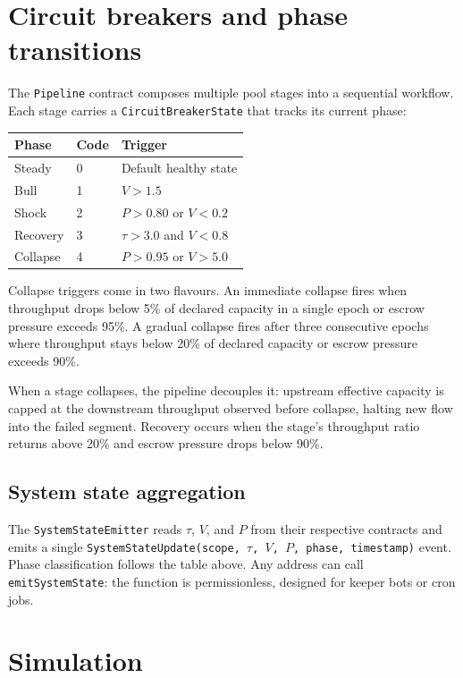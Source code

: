 \documentclass[11pt]{article}
\theoremstyle{definition}
\theoremstyle{remark}
\begin{document}
\section{Circuit breakers and phase transitions}
\label{sec:circuit}

The \texttt{Pipeline} contract composes multiple pool stages into a
sequential workflow. Each stage carries a \texttt{CircuitBreakerState}
that tracks its current phase:

\begin{center}
\begin{tabular}{lll}
\toprule
Phase & Code & Trigger \\
\midrule
Steady     & 0 & Default healthy state \\
Bull       & 1 & $V > 1.5$ \\
Shock      & 2 & $P > 0.80$ or $V < 0.2$ \\
Recovery   & 3 & $\tau > 3.0$ and $V < 0.8$ \\
Collapse   & 4 & $P > 0.95$ or $V > 5.0$ \\
\bottomrule
\end{tabular}
\end{center}

Collapse triggers come in two flavours. An immediate collapse fires
when throughput drops below 5\% of declared capacity in a single epoch
or escrow pressure exceeds 95\%. A gradual collapse fires after three
consecutive epochs where throughput stays below 20\% of declared
capacity or escrow pressure exceeds 90\%.

When a stage collapses, the pipeline decouples it: upstream effective
capacity is capped at the downstream throughput observed before
collapse, halting new flow into the failed segment. Recovery occurs
when the stage's throughput ratio returns above 20\% and escrow
pressure drops below 90\%.

\subsection{System state aggregation}

The \texttt{SystemStateEmitter} reads $\tau$, $V$, and $P$ from their
respective contracts and emits a single
\texttt{SystemStateUpdate(scope, $\tau$, $V$, $P$, phase, timestamp)}
event. Phase classification follows the table above. Any address can
call \texttt{emitSystemState}: the function is permissionless, designed
for keeper bots or cron jobs.

\section{Simulation}
\label{sec:sim}
\end{document}
